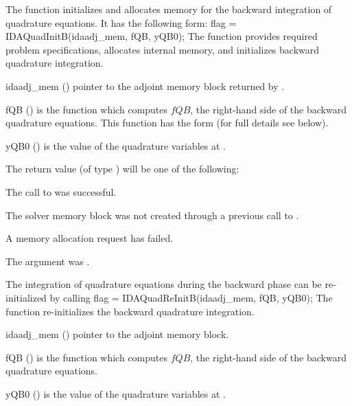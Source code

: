 The function  initializes and allocates memory for the backward
integration of quadrature equations. It has the following form:
{
flag = IDAQuadInitB(idaadj\_mem, fQB, yQB0);
}
{
  The function  provides required problem specifications,
  allocates internal memory, and initializes backward quadrature integration.
}
{
  \begin{args}
  \item[idaadj\_mem] ()
    pointer to the adjoint memory block returned by .
  \item[fQB] ()
    is the {\C} function which computes $fQB$, the right-hand side of the 
    backward quadrature equations. This function has the form 
     (for full details see below).
  \item[yQB0] ()
    is the value of the quadrature variables at .
  \end{args}
}
{
  The return value  (of type ) will be one of the following:
  \begin{args}
  \item[\Id{IDA\_SUCCESS}]
    The call to  was successful.
  \item[\Id{IDA\_MEM\_NULL}] 
    The {\idas} solver memory block was not created through a previous 
    call to .
  \item[\Id{IDA\_MEM\_FAIL}] 
    A memory allocation request has failed.
  \item[\Id{IDA\_ADJMEM\_NULL}]
    The  argument was .
  \end{args}
}
{}
The integration of quadrature equations during the backward phase can be
re-initialized by calling
{
  flag = IDAQuadReInitB(idaadj\_mem, fQB, yQB0);
}
{
  The function  re-initializes the backward quadrature integration.
}
{
  \begin{args}
  \item[idaadj\_mem] ()
    pointer to the adjoint memory block.
  \item[fQB] ()
    is the {\C} function which computes $fQB$, the right-hand side of the 
    backward quadrature equations.
  \item[yQB0] ()
    is the value of the quadrature variables at .
  \end{args}
}
